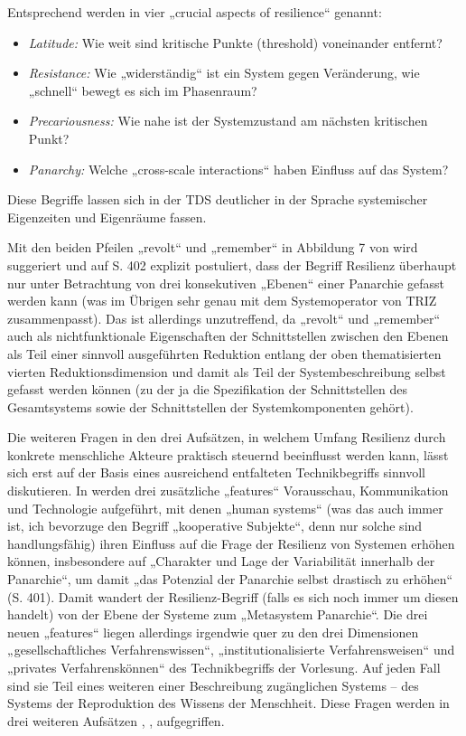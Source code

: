 \documentclass[11pt,a4paper]{article}
\begin{document}
Entsprechend werden in \cite{Walker2004} vier „crucial aspects of resilience“
genannt:
\begin{itemize}[noitemsep]
\item \emph{Latitude:} Wie weit sind kritische Punkte (threshold) voneinander
  entfernt?
\item \emph{Resistance:} Wie „widerständig“ ist ein System gegen Veränderung,
  wie „schnell“ bewegt es sich im Phasenraum?
\item \emph{Precariousness:} Wie nahe ist der Systemzustand am nächsten
  kritischen Punkt?
\item \emph{Panarchy:} Welche „cross-scale interactions“ haben Einfluss auf
  das System?
\end{itemize}
Diese Begriffe lassen sich in der TDS deutlicher in der Sprache systemischer
Eigenzeiten und Eigenräume fassen.

Mit den beiden Pfeilen „revolt“ und „remember“ in Abbildung 7 von
\cite{Holling2000} wird suggeriert und auf S. 402 explizit postuliert, dass
der Begriff Resilienz überhaupt nur unter Betrachtung von drei konsekutiven
„Ebenen“ einer Panarchie gefasst werden kann (was im Übrigen sehr genau mit
dem Systemoperator von TRIZ zusammenpasst). Das ist allerdings unzutreffend,
da „revolt“ und „remember“ auch als nichtfunktionale Eigenschaften der
Schnittstellen zwischen den Ebenen als Teil einer sinnvoll ausgeführten
Reduktion entlang der oben thematisierten vierten Reduktionsdimension und
damit als Teil der Systembeschreibung selbst gefasst werden können (zu der ja
die Spezifikation der Schnittstellen des Gesamtsystems sowie der
Schnittstellen der Systemkomponenten gehört).

Die weiteren Fragen in den drei Aufsätzen, in welchem Umfang Resilienz durch
konkrete menschliche Akteure praktisch steuernd beeinflusst werden kann, lässt
sich erst auf der Basis eines ausreichend entfalteten Technikbegriffs sinnvoll
diskutieren. In \cite{Holling2000} werden drei zusätzliche „features“
Vorausschau, Kommunikation und Technologie aufgeführt, mit denen „human
systems“ (was das auch immer ist, ich bevorzuge den Begriff „kooperative
Subjekte“, denn nur solche sind handlungsfähig) ihren Einfluss auf die Frage
der Resilienz von Systemen erhöhen können, insbesondere auf „Charakter und
Lage der Variabilität innerhalb der Panarchie“, um damit „das Potenzial der
Panarchie selbst drastisch zu erhöhen“ (S. 401). Damit wandert der
Resilienz-Begriff (falls es sich noch immer um diesen handelt) von der Ebene
der Systeme zum „Metasystem Panarchie“. Die drei neuen „features“ liegen
allerdings irgendwie quer zu den drei Dimensionen „gesellschaftliches
Verfahrenswissen“, „institutionalisierte Verfahrensweisen“ und „privates
Verfahrenskönnen“ des Technikbegriffs der Vorlesung. Auf jeden Fall sind sie
Teil eines weiteren einer Beschreibung zugänglichen Systems -- des Systems der
Reproduktion des Wissens der Menschheit. Diese Fragen werden in drei weiteren
Aufsätzen \cite{Stollorz2011}, \cite{Helfrich2011}, \cite{Dobusch2011}
aufgegriffen.
\end{document}
